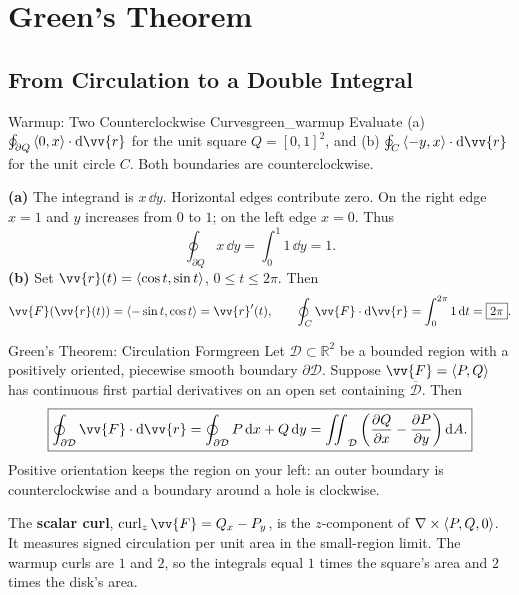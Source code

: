 \section{Green's Theorem}

\subsection{From Circulation to a Double Integral}

\begin{problem}{Warmup: Two Counterclockwise Curves}{green_warmup}
Evaluate (a) $\oint_{\partial Q}\ang{0,x}\cdot\dd{\vv{r}}$ for the unit square $Q = [0,1]^2$, and (b) $\oint_C\ang{-y,x}\cdot\dd{\vv{r}}$ for the unit circle $C$. Both boundaries are counterclockwise.
\end{problem}
\begin{sol}
\textbf{(a)} The integrand is $x\,\dd{y}$. Horizontal edges contribute zero. On the right edge $x = 1$ and $y$ increases from $0$ to $1$; on the left edge $x = 0$. Thus
\[
    \oint_{\partial Q}x\,\dd{y} = \int_0^1 1\,\dd{y} = \boxed{1}.
\]
\textbf{(b)} Set $\vv{r}(t) = \ang{\cos t,\sin t}$, $0 \le t \le 2\pi$. Then
\[
    \vv{F}(\vv{r}(t)) = \ang{-\sin t,\cos t} = \vv{r}'(t),\qquad
    \oint_C\vv{F}\cdot\dd{\vv{r}} = \int_0^{2\pi}1\,\dd{t} = \boxed{2\pi}.
\]
\end{sol}

\begin{theorem}{Green's Theorem: Circulation Form}{green}
Let $\mathcal{D} \subset \mathbb{R}^2$ be a bounded region with a positively oriented, piecewise smooth boundary $\partial\mathcal{D}$. Suppose $\vv{F} = \ang{P,Q}$ has continuous first partial derivatives on an open set containing $\overline{\mathcal{D}}$. Then
\[
    \boxed{\oint_{\partial\mathcal{D}}\vv{F}\cdot\dd{\vv{r}}
    = \oint_{\partial\mathcal{D}}P\,\dd{x} + Q\,\dd{y}
    = \iint_{\mathcal{D}}\left(\frac{\partial Q}{\partial x} - \frac{\partial P}{\partial y}\right)\dd{A}.}
\]
Positive orientation keeps the region on your left: an outer boundary is counterclockwise and a boundary around a hole is clockwise.
\end{theorem}

The \textbf{scalar curl}, $\operatorname{curl}_z\vv{F} = Q_x - P_y$, is the $z$-component of $\nabla \times \left\langle P,Q,0 \right\rangle$. It measures signed circulation per unit area in the small-region limit. The warmup curls are $1$ and $2$, so the integrals equal $1$ times the square's area and $2$ times the disk's area.

